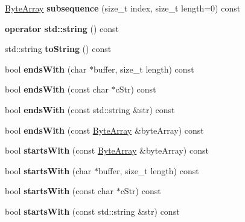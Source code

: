 \begin{DoxyCompactItemize}
\mbox{\label{class_cpp_serial_port_1_1_byte_array_ae5ffac67be63d8460bab8629a3b8abf1}} 
\mbox{\hyperlink{class_cpp_serial_port_1_1_byte_array}{Byte\+Array}} {\bfseries subsequence} (size\+\_\+t index, size\+\_\+t length=0) const
\item 
\mbox{\label{class_cpp_serial_port_1_1_byte_array_a3d166620e56a10cae5fdca7146049df3}} 
{\bfseries operator std\+::string} () const
\item 
\mbox{\label{class_cpp_serial_port_1_1_byte_array_a306587c32700189c63b87c74ee545e88}} 
std\+::string {\bfseries to\+String} () const
\item 
\mbox{\label{class_cpp_serial_port_1_1_byte_array_a17d02a928f65365caafefe734bd4eb11}} 
bool {\bfseries ends\+With} (char $\ast$buffer, size\+\_\+t length) const
\item 
\mbox{\label{class_cpp_serial_port_1_1_byte_array_acee5d5286d1cd52df13e4a365dac296c}} 
bool {\bfseries ends\+With} (const char $\ast$c\+Str) const
\item 
\mbox{\label{class_cpp_serial_port_1_1_byte_array_af42e1ee52db0628f0370f53e1331da8b}} 
bool {\bfseries ends\+With} (const std\+::string \&str) const
\item 
\mbox{\label{class_cpp_serial_port_1_1_byte_array_af2184794bed19453f35de421ce73157b}} 
bool {\bfseries ends\+With} (const \mbox{\hyperlink{class_cpp_serial_port_1_1_byte_array}{Byte\+Array}} \&byte\+Array) const
\item 
\mbox{\label{class_cpp_serial_port_1_1_byte_array_a17a744f091521f48097efe35a0e10d2e}} 
bool {\bfseries starts\+With} (const \mbox{\hyperlink{class_cpp_serial_port_1_1_byte_array}{Byte\+Array}} \&byte\+Array) const
\item 
\mbox{\label{class_cpp_serial_port_1_1_byte_array_accc312c1828fda5f2109084be0c2649b}} 
bool {\bfseries starts\+With} (char $\ast$buffer, size\+\_\+t length) const
\item 
\mbox{\label{class_cpp_serial_port_1_1_byte_array_ad5a9365f8a12bdbd2f626d7ba6f70b96}} 
bool {\bfseries starts\+With} (const char $\ast$c\+Str) const
\item 
\mbox{\label{class_cpp_serial_port_1_1_byte_array_a488dace2577458a9948c13745a5f4722}} 
bool {\bfseries starts\+With} (const std\+::string \&str) const
\end{DoxyCompactItemize}
